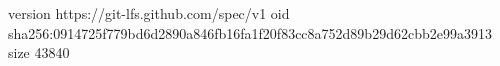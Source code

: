 version https://git-lfs.github.com/spec/v1
oid sha256:0914725f779bd6d2890a846fb16fa1f20f83cc8a752d89b29d62cbb2e99a3913
size 43840
